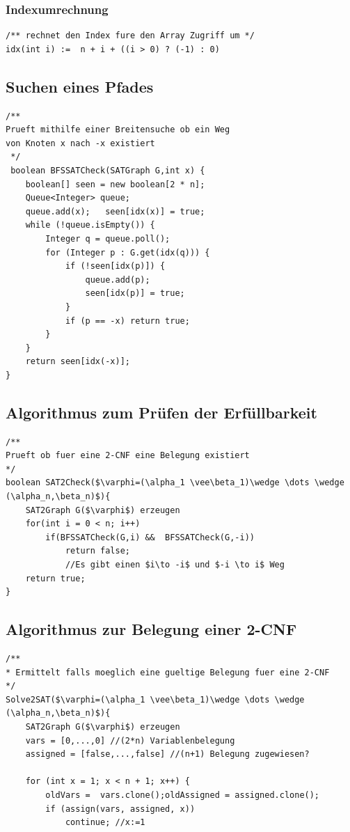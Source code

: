 \documentclass[10pt,a4paper,ngerman,oneside,]{article}
\begin{document}
\begin{multicols}{2}
\subsubsection{Indexumrechnung}
\begin{lstlisting}
/** rechnet den Index fure den Array Zugriff um */
idx(int i) :=  n + i + ((i > 0) ? (-1) : 0)
\end{lstlisting}
\subsection{Suchen eines Pfades}
\begin{lstlisting}
/** 
Prueft mithilfe einer Breitensuche ob ein Weg 
von Knoten x nach -x existiert
 */
 boolean BFSSATCheck(SATGraph G,int x) {
	boolean[] seen = new boolean[2 * n];
	Queue<Integer> queue;
	queue.add(x);	seen[idx(x)] = true;
	while (!queue.isEmpty()) {
		Integer q = queue.poll();
		for (Integer p : G.get(idx(q))) {
			if (!seen[idx(p)]) {
				queue.add(p);
				seen[idx(p)] = true;
			}
			if (p == -x) return true;
		}
	}
	return seen[idx(-x)];
}
\end{lstlisting}

\subsection{Algorithmus zum Prüfen der Erfüllbarkeit}
\begin{lstlisting}[]
/** 
Prueft ob fuer eine 2-CNF eine Belegung existiert 
*/
boolean SAT2Check($\varphi=(\alpha_1 \vee\beta_1)\wedge \dots \wedge (\alpha_n,\beta_n)$){
	SAT2Graph G($\varphi$) erzeugen
	for(int i = 0 < n; i++)
		if(BFSSATCheck(G,i) &&	BFSSATCheck(G,-i))	
			return false; 
			//Es gibt einen $i\to -i$ und $-i \to i$ Weg
	return true;
}

\end{lstlisting}
\subsection{Algorithmus zur Belegung einer 2-CNF}
\begin{lstlisting}
/**
* Ermittelt falls moeglich eine gueltige Belegung fuer eine 2-CNF
*/
Solve2SAT($\varphi=(\alpha_1 \vee\beta_1)\wedge \dots \wedge (\alpha_n,\beta_n)$){
	SAT2Graph G($\varphi$) erzeugen
	vars = [0,...,0] //(2*n) Variablenbelegung
	assigned = [false,...,false] //(n+1) Belegung zugewiesen?

	for (int x = 1; x < n + 1; x++) {
		oldVars =  vars.clone();oldAssigned = assigned.clone();
		if (assign(vars, assigned, x)) 	
			continue; //x:=1
		

\end{lstlisting}
\end{multicols}
\end{document}
